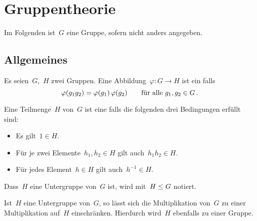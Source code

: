 \chapter{Gruppentheorie}

\begin{convention}
  Im Folgenden ist~$G$ eine Gruppe, sofern nicht anders angegeben.
\end{convention}

\section{Allgemeines}

\begin{definition}
  Es seien~$G$,~$H$ zwei Gruppen.
  Eine Abbildung~$\varphi \colon G \to H$ ist ein  falls
  \[
    \varphi(g_1 g_2) = \varphi(g_1) \, \varphi(g_2)
    \qquad
    \text{für alle~$g_1, g_2 \in G$} \,.
  \]
\end{definition}

\begin{definition}
  Eine Teilmenge~$H$ von~$G$ ist eine  falls die folgenden drei Bedingungen erfüllt sind:
  \begin{itemize}
    \item
      Es gilt~$1 \in H$.
    \item
      Für je zwei Elemente~$h_1, h_2 \in H$ gilt auch~$h_1 h_2 \in H$.
    \item
      Für jedes Element~$h \in H$ gilt auch~$h^{-1} \in H$.
  \end{itemize}
  Dass~$H$ eine Untergruppe von~$G$ ist, wird mit~$H \leq G$ notiert.
\end{definition}

Ist~$H$ eine Untergruppe von~$G$, so lässt sich die Multiplikation von~$G$ zu einer Multiplikation auf~$H$ einschränken.
Hierdurch wird~$H$ ebenfalls zu einer Gruppe.

